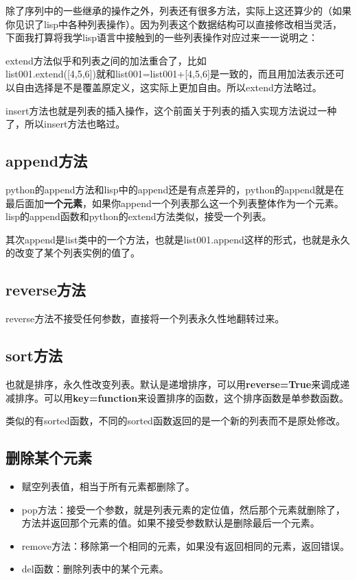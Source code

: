 \documentclass[12pt,oneside]{book}
\begin{document}
\begin{common-format}
除了序列中的一些继承的操作之外，列表还有很多方法，实际上这还算少的（如果你见识了lisp中各种列表操作）。因为列表这个数据结构可以直接修改相当灵活，下面我打算将我学lisp语言中接触到的一些列表操作对应过来一一说明之：

extend方法似乎和列表之间的加法重合了，比如\\list001.extend([4,5,6])就和list001=list001+[4,5,6]是一致的，而且用加法表示还可以自由选择是不是覆盖原定义，这实际上更加自由。所以extend方法略过。

insert方法也就是列表的插入操作，这个前面关于列表的插入实现方法说过一种了，所以insert方法也略过。

\subsection{append方法}
python的append方法和lisp中的append还是有点差异的，python的append就是在最后面加\textbf{一个元素}，如果你append一个列表那么这一个列表整体作为一个元素。lisp的append函数和python的extend方法类似，接受一个列表。

其次append是list类中的一个方法，也就是list001.append这样的形式，也就是永久的改变了某个列表实例的值了。



\subsection{reverse方法}
reverse方法不接受任何参数，直接将一个列表永久性地翻转过来。

\subsection{sort方法}
也就是排序，永久性改变列表。默认是递增排序，可以用\textbf{reverse=True}来调成递减排序。可以用\textbf{key=function}来设置排序的函数，这个排序函数是单参数函数。

类似的有sorted函数，不同的sorted函数返回的是一个新的列表而不是原处修改。



\subsection{删除某个元素}
\begin{itemize}
\item 赋空列表值，相当于所有元素都删除了。 
\item pop方法：接受一个参数，就是列表元素的定位值，然后那个元素就删除了，方法并返回那个元素的值。如果不接受参数默认是删除最后一个元素。
\item remove方法：移除第一个相同的元素，如果没有返回相同的元素，返回错误。
\item del函数：删除列表中的某个元素。
\end{itemize}


\end{common-format}
\end{document}
